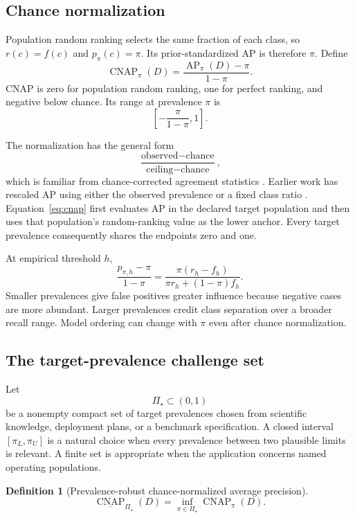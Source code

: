 \documentclass[11pt]{article}
\newcommand{\AP}{\operatorname{AP}}
\newcommand{\CNAP}{\operatorname{CNAP}}
\newcommand{\PSet}{\Pi_\star}
\newcommand{\RobCNAP}{\underline{\CNAP}_{\PSet}}
\newtheorem{definition}{Definition}
\theoremstyle{remark}
\begin{document}
\subsection{Chance normalization}

Population random ranking selects the same fraction of each class, so $r(c)=f(c)$ and $p_\pi(c)=\pi$. Its prior-standardized AP is therefore $\pi$. Define
\begin{equation}
\CNAP_\pi(D)
=
\frac{\AP_\pi(D)-\pi}{1-\pi}.
\label{eq:cnap}
\end{equation}
CNAP is zero for population random ranking, one for perfect ranking, and negative below chance. Its range at prevalence $\pi$ is
\[
\left[-\frac{\pi}{1-\pi},1\right].
\]

The normalization has the general form
\[
\frac{\text{observed}-\text{chance}}
{\text{ceiling}-\text{chance}},
\]
which is familiar from chance-corrected agreement statistics \cite{cohen1960coefficient}. Earlier work has rescaled AP using either the observed prevalence or a fixed class ratio \cite{suyuan2015relationship,bestgen2021fisher}. Equation~\eqref{eq:cnap} first evaluates AP in the declared target population and then uses that population's random-ranking value as the lower anchor. Every target prevalence consequently shares the endpoints zero and one.

At empirical threshold $h$,
\begin{equation}
\frac{p_{\pi,h}-\pi}{1-\pi}
=
\frac{\pi(r_h-f_h)}
{\pi r_h+(1-\pi)f_h}.
\label{eq:threshold-cnap}
\end{equation}
Smaller prevalences give false positives greater influence because negative cases are more abundant. Larger prevalences credit class separation over a broader recall range. Model ordering can change with $\pi$ even after chance normalization.

\subsection{The target-prevalence challenge set}

Let
\[
\PSet\subset(0,1)
\]
be a nonempty compact set of target prevalences chosen from scientific knowledge, deployment plans, or a benchmark specification. A closed interval $[\pi_L,\pi_U]$ is a natural choice when every prevalence between two plausible limits is relevant. A finite set is appropriate when the application concerns named operating populations.

\begin{definition}[Prevalence-robust chance-normalized average precision]
\begin{equation}
\RobCNAP(D)
=
\inf_{\pi\in\PSet}\CNAP_\pi(D).
\label{eq:robust-cnap}
\end{equation}
\end{definition}
\end{document}
